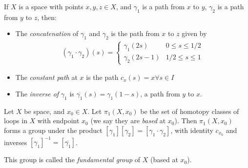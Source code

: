 \documentclass[10pt,a4paper]{article}
\begin{document}
If $X$ is a space with points $x,y,z \in X$, and $\gamma_1$ is a path from $x$ to $y$, $\gamma_2$ is a path from $y$ to $z$, then:
\begin{itemize}
\item The \emph{concatenation} of $\gamma_1$ and $\gamma_2$ is the path from $x$ to $z$ given by
\begin{align*}
(\gamma_1 \cdot \gamma_2) (s) = \begin{cases} \gamma_1(2s) & 0\leq s\leq 1/2 \\ \gamma_2(2s-1) & 1/2\leq s\leq 1\end{cases}
\end{align*}
\item The \emph{constant path} at $x$ is the path $c_x(s) = x \forall s \in I$
\item The \emph{inverse of} $\gamma_1$ is $\overline{\gamma_1}(s) = \gamma_1(1-s)$, a path from $y$ to $x$.
\end{itemize}
\begin{center}
\end{center}

\begin{theorem}
Let $X$ be space, and $x_0 \in X$. Let $\pi_1(X,x_0)$ be the set of homotopy classes of loops in $X$ with endpoint $x_0$ (we say they are \emph{based} at $x_0$). Then $\pi_1(X,x_0)$ forms a group under the product $[\gamma_1][\gamma_2] = [\gamma_1\cdot\gamma_2]$, with identity $c_{x_0}$ and inverses $[\gamma_1]^{-1} = [\overline{\gamma_1}]$.

This group is called the \emph{fundamental group} of $X$ (based at $x_0$).
\end{theorem}
\end{document}
